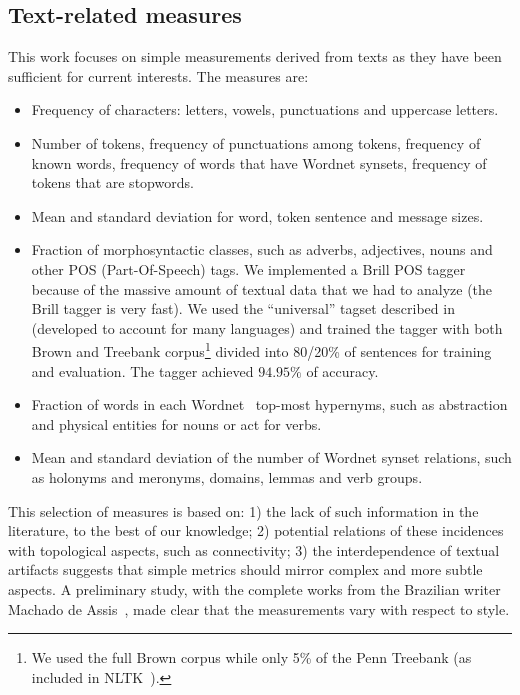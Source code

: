 \documentclass[review]{elsarticle}
\begin{document}
\subsection{Text-related measures}
This work focuses on simple measurements derived from texts as they have been sufficient for current interests.
The measures are:
\begin{itemize}
\item Frequency of characters: letters, vowels, punctuations and uppercase letters.
\item Number of tokens, frequency of punctuations among tokens, frequency of known words, frequency of words that have Wordnet synsets, frequency of tokens that are stopwords.
\item Mean and standard deviation for word, token sentence and message sizes.
\item Fraction of morphosyntactic classes, such as adverbs, adjectives, nouns and other POS (Part-Of-Speech) tags.
	We implemented a Brill POS tagger because of the massive amount of textual data that we had to analyze (the Brill tagger is very fast).
	We used the ``universal'' tagset described in~\cite{petrov} (developed to account for many languages) and trained the tagger with both Brown and Treebank corpus\footnote{We
		used the full Brown corpus while only 5\% of the Penn Treebank (as included in NLTK~\cite{trabNLTK}).}
	divided into 80/20\% of sentences for training and evaluation. The tagger achieved $94.95\%$ of accuracy.
\item Fraction of words in each Wordnet~\cite{wordnet} top-most hypernyms,
such as abstraction and physical entities for nouns or act for verbs.
\item Mean and standard deviation of the number of Wordnet synset relations, such as holonyms and meronyms, domains, lemmas and verb groups.
\end{itemize}

This selection of measures is based on: 1) the lack of such information in the literature, to the best of our knowledge; 
2) potential relations of these incidences with topological aspects, such as connectivity;
3) the interdependence of textual artifacts suggests that simple metrics should mirror complex and more subtle aspects.
A preliminary study, with the complete works from the Brazilian writer Machado de Assis~\cite{machado}, made clear that the measurements vary with respect to style.
\end{document}
